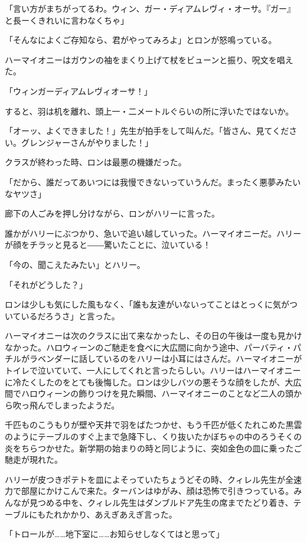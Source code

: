 \documentclass[10pt,a4paper]{article}
\begin{document}
\begin{CJK}{UTF8}{min}
「言い方がまちがってるわ。ウィン、ガー・ディアムレヴィ・オーサ。『ガー』と長ーくきれいに言わなくちゃ」

「そんなによくご存知なら、君がやってみろよ」とロンが怒鳴っている。

ハーマイオニーはガウンの袖をまくり上げて杖をビューンと振り、呪文を唱えた。

「ウィンガーディアムレヴィオーサ！」

すると、羽は机を離れ、頭上一・二メートルぐらいの所に浮いたではないか。

「オーッ、よくできました！」先生が拍手をして叫んだ。「皆さん、見てください。グレンジャーさんがやりました！」

クラスが終わった時、ロンは最悪の機嫌だった。

「だから、誰だってあいつには我慢できないっていうんだ。まったく悪夢みたいなヤツさ」

廊下の人ごみを押し分けながら、ロンがハリーに言った。

誰かがハリーにぶつかり、急いで追い越していった。ハーマイオニーだ。ハリーが顔をチラッと見ると――驚いたことに、泣いている！

「今の、聞こえたみたい」とハリー。

「それがどうした？」

ロンは少しも気にした風もなく、「誰も友達がいないってことはとっくに気がついているだろうさ」と言った。

ハーマイオニーは次のクラスに出て来なかったし、その日の午後は一度も見かけなかった。ハロウィーンのご馳走を食べに大広間に向かう途中、パーバティ・パチルがラベンダーに話しているのをハリーは小耳にはさんだ。ハーマイオニーがトイレで泣いていて、一人にしてくれと言ったらしい。ハリーはハーマイオニーに冷たくしたのをとても後悔した。ロンは少しバツの悪そうな顔をしたが、大広間でハロウィーンの飾りつけを見た瞬間、ハーマイオニーのことなど二人の頭から吹っ飛んでしまったようだ。



千匹ものこうもりが壁や天井で羽をばたつかせ、もう千匹が低くたれこめた黒雲のようにテーブルのすぐ上まで急降下し、くり抜いたかぼちゃの中のろうそくの炎をちらつかせた。新学期の始まりの時と同じように、突如金色の皿に乗ったご馳走が現れた。

ハリーが皮つきポテトを皿によそっていたちょうどその時、クィレル先生が全速力で部屋にかけこんで来た。ターバンはゆがみ、顔は恐怖で引きつっている。みんなが見つめる中を、クィレル先生はダンブルドア先生の席までたどり着き、テーブルにもたれかかり、あえぎあえぎ言った。

「トロールが……地下室に……お知らせしなくてはと思って」


\end{CJK}
\end{document}
